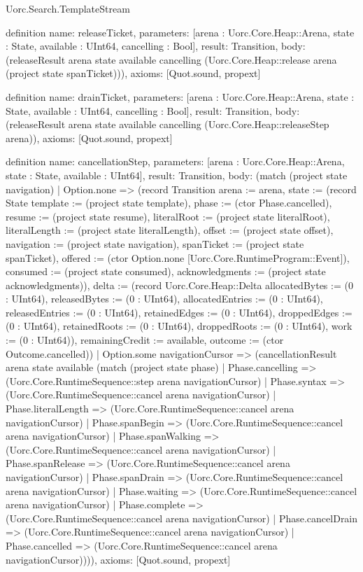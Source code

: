 \begin{lexlean}{Uorc.Search.TemplateStream}
\begin{semanticmodule}
definition{
  name: releaseTicket,
  parameters: [arena : Uorc.Core.Heap::Arena, state : State, available : UInt64, cancelling : Bool],
  result: Transition,
  body: (releaseResult arena state available cancelling (Uorc.Core.Heap::release arena (project state spanTicket))),
  axioms: [Quot.sound, propext]
}

definition{
  name: drainTicket,
  parameters: [arena : Uorc.Core.Heap::Arena, state : State, available : UInt64, cancelling : Bool],
  result: Transition,
  body: (releaseResult arena state available cancelling (Uorc.Core.Heap::releaseStep arena)),
  axioms: [Quot.sound, propext]
}

definition{
  name: cancellationStep,
  parameters: [arena : Uorc.Core.Heap::Arena, state : State, available : UInt64],
  result: Transition,
  body: (match (project state navigation)
    | Option.none => (record Transition {arena := arena, state := (record State {template := (project state template), phase := (ctor Phase.cancelled), resume := (project state resume), literalRoot := (project state literalRoot), literalLength := (project state literalLength), offset := (project state offset), navigation := (project state navigation), spanTicket := (project state spanTicket), offered := (ctor Option.none [Uorc.Core.RuntimeProgram::Event]), consumed := (project state consumed), acknowledgments := (project state acknowledgments)}), delta := (record Uorc.Core.Heap::Delta {allocatedBytes := (0 : UInt64), releasedBytes := (0 : UInt64), allocatedEntries := (0 : UInt64), releasedEntries := (0 : UInt64), retainedEdges := (0 : UInt64), droppedEdges := (0 : UInt64), retainedRoots := (0 : UInt64), droppedRoots := (0 : UInt64), work := (0 : UInt64)}), remainingCredit := available, outcome := (ctor Outcome.cancelled)})
    | Option.some navigationCursor => (cancellationResult arena state available (match (project state phase)
      | Phase.cancelling => (Uorc.Core.RuntimeSequence::step arena navigationCursor)
      | Phase.syntax => (Uorc.Core.RuntimeSequence::cancel arena navigationCursor)
      | Phase.literalLength => (Uorc.Core.RuntimeSequence::cancel arena navigationCursor)
      | Phase.spanBegin => (Uorc.Core.RuntimeSequence::cancel arena navigationCursor)
      | Phase.spanWalking => (Uorc.Core.RuntimeSequence::cancel arena navigationCursor)
      | Phase.spanRelease => (Uorc.Core.RuntimeSequence::cancel arena navigationCursor)
      | Phase.spanDrain => (Uorc.Core.RuntimeSequence::cancel arena navigationCursor)
      | Phase.waiting => (Uorc.Core.RuntimeSequence::cancel arena navigationCursor)
      | Phase.complete => (Uorc.Core.RuntimeSequence::cancel arena navigationCursor)
      | Phase.cancelDrain => (Uorc.Core.RuntimeSequence::cancel arena navigationCursor)
      | Phase.cancelled => (Uorc.Core.RuntimeSequence::cancel arena navigationCursor)))),
  axioms: [Quot.sound, propext]
}


\end{semanticmodule}
\end{lexlean}
